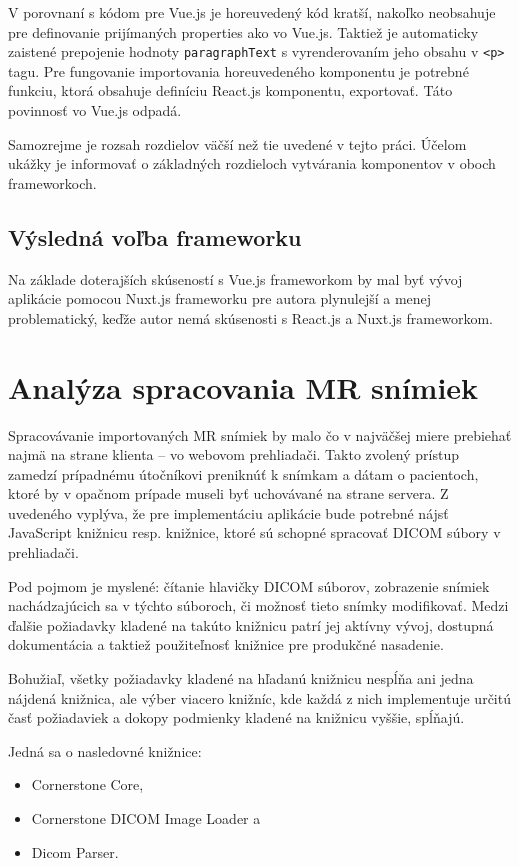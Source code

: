 V porovnaní s kódom pre Vue.js je horeuvedený kód kratší, nakoľko neobsahuje  pre definovanie prijímaných properties ako vo Vue.js. Taktiež je automaticky zaistené prepojenie hodnoty \texttt{paragraphText} s vyrenderovaním jeho obsahu v \texttt{<p>} tagu. Pre fungovanie importovania horeuvedeného komponentu je potrebné funkciu, ktorá obsahuje definíciu React.js komponentu, exportovať. Táto povinnosť vo Vue.js odpadá.

Samozrejme je rozsah rozdielov väčší než tie uvedené v tejto práci. Účelom ukážky je informovať o základných rozdieloch vytvárania komponentov v oboch frameworkoch.

\subsection {Výsledná voľba frameworku}
Na základe doterajších skúseností s Vue.js frameworkom by mal byť vývoj aplikácie pomocou Nuxt.js frameworku pre autora plynulejší a menej problematický, keďže autor nemá skúsenosti s React.js a Nuxt.js frameworkom.

\clearpage

\section {Analýza spracovania MR snímiek}
Spracovávanie importovaných MR snímiek by malo čo v najväčšej miere prebiehať najmä na strane klienta -- vo webovom prehliadači. Takto zvolený prístup zamedzí prípadnému útočníkovi preniknúť k snímkam a dátam o pacientoch, ktoré by v opačnom prípade museli byť uchovávané na strane servera. Z uvedeného vyplýva, že pre implementáciu aplikácie bude potrebné nájsť JavaScript knižnicu resp. knižnice, ktoré sú schopné spracovať DICOM súbory v prehliadači.

Pod pojmom  je myslené: čítanie hlavičky DICOM súborov, zobrazenie snímiek nachádzajúcich sa v týchto súboroch, či možnosť tieto snímky modifikovať. Medzi ďalšie požiadavky kladené na takúto knižnicu patrí jej aktívny vývoj, dostupná dokumentácia a taktiež použiteľnosť knižnice pre produkčné nasadenie.

Bohužiaľ, všetky požiadavky kladené na hľadanú knižnicu nespĺňa ani jedna nájdená knižnica, ale výber viacero knižníc, kde každá z nich implementuje určitú časť požiadaviek a dokopy podmienky kladené na knižnicu vyššie, spĺňajú.

Jedná sa o nasledovné knižnice:
\begin {itemize}
\item {Cornerstone Core,}
\item {Cornerstone DICOM Image Loader a}
\item {Dicom Parser.}
\end {itemize}

